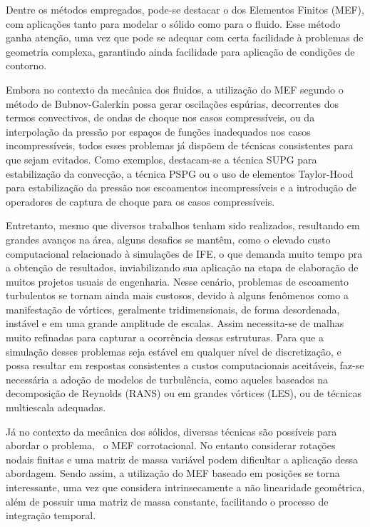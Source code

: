 Dentre os métodos empregados, pode-se destacar o dos Elementos Finitos (MEF), com aplicações tanto para modelar o sólido como para o fluido. Esse método ganha atenção, uma vez que pode se adequar com certa facilidade à problemas de geometria complexa, garantindo ainda facilidade para aplicação de condições de contorno.

Embora no contexto da mecânica dos fluidos, a utilização do MEF segundo o método de Bubnov-Galerkin possa gerar oscilações espúrias, decorrentes dos termos convectivos, de ondas de choque nos casos compressíveis, ou da interpolação da pressão por espaços de funções inadequados nos casos incompressíveis, todos esses problemas já dispõem de técnicas consistentes para que sejam evitados. Como exemplos, destacam-se a técnica SUPG para estabilização da convecção, a técnica PSPG ou o uso de elementos Taylor-Hood para estabilização da pressão nos escoamentos incompressíveis e a introdução de operadores de captura de choque para os casos compressíveis.

Entretanto, mesmo que diversos trabalhos tenham sido realizados, resultando em grandes avanços na área, alguns desafios se mantêm, como o elevado custo computacional relacionado à simulações de IFE, o que demanda muito tempo pra a obtenção de resultados, inviabilizando sua aplicação na etapa de elaboração de muitos projetos usuais de engenharia. Nesse cenário, problemas de escoamento turbulentos se tornam ainda mais custosos, devido à alguns fenômenos como a manifestação de vórtices, geralmente tridimensionais, de forma desordenada, instável e em uma grande amplitude de escalas. Assim necessita-se de malhas muito refinadas para capturar a ocorrência dessas estruturas. Para que a simulação desses problemas seja estável em qualquer nível de discretização, e possa resultar em respostas consistentes a custos computacionais aceitáveis, faz-se necessária a adoção de modelos de turbulência, como  aqueles baseados na decomposição de Reynolds (RANS) ou em grandes vórtices (LES), ou de técnicas multiescala adequadas.

Já no contexto da mecânica dos sólidos, diversas técnicas são possíveis para abordar o problema, \eg\ o MEF corrotacional. No entanto considerar rotações nodais finitas e uma matriz de massa variável podem dificultar a aplicação dessa abordagem. Sendo assim, a utilização do MEF baseado em posições se torna interessante, uma vez que considera intrinsecamente a não linearidade geométrica, além de possuir uma matriz de massa constante, facilitando o processo de integração temporal.

